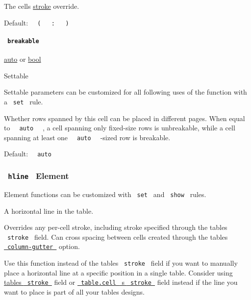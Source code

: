 The cell\textquotesingle s
\href{/docs/reference/model/table/\#parameters-stroke}{stroke} override.

Default:
\texttt{\ }{\texttt{\ (\ }}\texttt{\ }{\texttt{\ :\ }}\texttt{\ }{\texttt{\ )\ }}\texttt{\ }

\paragraph{\texorpdfstring{\texttt{\ breakable\ }}{ breakable }}\label{definitions-cell-breakable}

\href{/docs/reference/foundations/auto/}{auto} {or}
\href{/docs/reference/foundations/bool/}{bool}

{{ Settable }}

\label{definitions-cell-breakable-settable-tooltip}
Settable parameters can be customized for all following uses of the
function with a \texttt{\ set\ } rule.

Whether rows spanned by this cell can be placed in different pages. When
equal to \texttt{\ }{\texttt{\ auto\ }}\texttt{\ } , a cell spanning
only fixed-size rows is unbreakable, while a cell spanning at least one
\texttt{\ }{\texttt{\ auto\ }}\texttt{\ } -sized row is breakable.

Default: \texttt{\ }{\texttt{\ auto\ }}\texttt{\ }

\subsubsection{\texorpdfstring{\texttt{\ hline\ } {{ Element
}}}{ hline   Element }}\label{definitions-hline}

\label{definitions-hline-element-tooltip}
Element functions can be customized with \texttt{\ set\ } and
\texttt{\ show\ } rules.

A horizontal line in the table.

Overrides any per-cell stroke, including stroke specified through the
table\textquotesingle s \texttt{\ stroke\ } field. Can cross spacing
between cells created through the table\textquotesingle s
\href{/docs/reference/model/table/\#parameters-column-gutter}{\texttt{\ column-gutter\ }}
option.

Use this function instead of the table\textquotesingle s
\texttt{\ stroke\ } field if you want to manually place a horizontal
line at a specific position in a single table. Consider using
\href{/docs/reference/model/table/\#parameters-stroke}{table\textquotesingle s
\texttt{\ stroke\ }} field or
\href{/docs/reference/model/table/\#definitions-cell-stroke}{\texttt{\ table.cell\ }
\textquotesingle s \texttt{\ stroke\ }} field instead if the line you
want to place is part of all your tables\textquotesingle{} designs.

